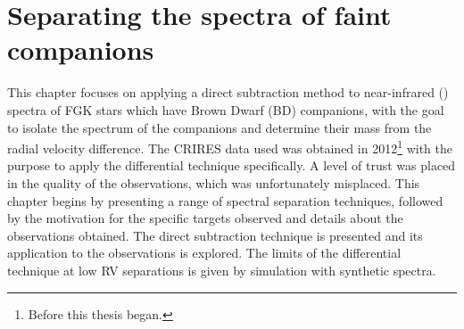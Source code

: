 
\chapter{Separating the spectra of faint companions} %
\label{cha:direct_recovery}

This chapter focuses on applying a direct subtraction method to near-infrared (\nir{}) spectra of {FGK} stars which have Brown Dwarf (BD) companions, with the goal to isolate the spectrum of the companions and determine their mass from the radial velocity difference.
The {CRIRES} data used was obtained in 2012\footnote{Before this thesis began.} with the purpose to apply the differential technique specifically.
A level of trust was placed in the quality of the observations, which was unfortunately misplaced.
This chapter begins by presenting a range of spectral separation techniques, followed by the motivation for the specific targets observed and details about the observations obtained.
The direct subtraction technique is presented and its application to the observations is explored.
The limits of the differential technique at low {RV} separations is given by simulation with synthetic spectra.
























